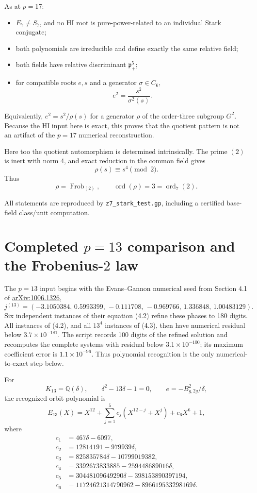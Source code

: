 \documentclass[11pt,reqno]{amsart}
\theoremstyle{plain}
\begin{document}
As at \(p=17\):

\begin{itemize}
\item \(E_7\neq S_7\), and no HI root is pure-power-related to an individual Stark conjugate;
\item both polynomials are irreducible and define exactly the same relative field;
\item both fields have relative discriminant \(\mathfrak p_+^5\);
\item for compatible roots \(e,s\) and a generator \(\sigma\in C_6\),
\[
\boxed{
e^2=\frac{s^2}{\sigma^2(s)}.
}
\]
\end{itemize}

Equivalently, \(e^2=s^2/\rho(s)\) for a generator \(\rho\) of the order-three subgroup \(G^2\). Because the HI input here is exact, this proves that the quotient pattern is not an artifact of the \(p=17\) numerical reconstruction.

Here too the quotient automorphism is determined intrinsically. The prime \((2)\) is inert with norm \(4\), and exact reduction in the common field gives
\[
\rho(s)\equiv s^4\pmod 2.
\]
Thus
\[
\rho=\operatorname{Frob}_{(2)},
\qquad
\operatorname{ord}(\rho)=3=\operatorname{ord}_7(2).
\]

All statements are reproduced by \texttt{z7\_\allowbreak stark\_\allowbreak test.gp}, including a certified base-field class/unit computation.

\section{\texorpdfstring{Completed \(p=13\) comparison and the Frobenius-\(2\) law}{Completed p=13 comparison and the Frobenius-2 law}}\label{sec:25}

The \(p=13\) input begins with the Evans--Gannon numerical seed from Section 4.1 of \href{https://arxiv.org/abs/1006.1326}{arXiv:1006.1326},
\[
j^{(13)}=(-3.1050384,\,0.5993399,\,-0.111708,\,-0.969766,\,1.336848,\,1.00483129).
\]
Six independent instances of their equation (4.2) refine these phases to 180 digits. All instances of (4.2), and all \(13^4\) instances of (4.3), then have numerical residual below \(3.7\times10^{-181}\). The script records 100 digits of the refined solution and recomputes the complete systems with residual below \(3.1\times10^{-100}\); its maximum coefficient error is \(1.1\times10^{-96}\). Thus polynomial recognition is the only numerical-to-exact step below.

For
\[
K_{13}=\mathbb Q(\delta),
\qquad
\delta^2-13\delta-1=0,
\qquad
e=-B_{g,2g}^2/\delta,
\]
the recognized orbit polynomial is
\[
E_{13}(X)=X^{12}+\sum_{j=1}^{5}c_j(X^{12-j}+X^j)+c_6X^6+1,
\]
where
\[
\begin{aligned}
c_1&=467\delta-6097,\\
c_2&=12814191-979939\delta,\\
c_3&=825835784\delta-10799019382,\\
c_4&=3392673833885-259448689016\delta,\\
c_5&=30448109649290\delta-398153890397194,\\
c_6&=11724621314790962-896619533298169\delta.
\end{aligned}
\]
\end{document}
